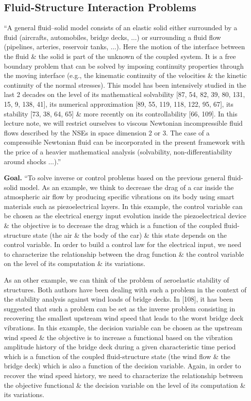\documentclass[oneside]{book}
\numberwithin{equation}{section}
\begin{document}
\subsection{Fluid-Structure Interaction Problems}
``A general fluid--solid model consists of an elastic solid either surrounded by a fluid (aircrafts, automobiles, bridge decks, $\ldots$) or surrounding a fluid flow (pipelines, arteries, reservoir tanks, $\ldots$). Here the motion of the interface between the fluid \& the solid is part of the unknown of the coupled system. It is a free boundary problem that can be solved by imposing continuity properties through the moving interface (e.g., the kinematic continuity of the velocities \& the kinetic continuity of the normal stresses). This model has been intensively studied in the last 2 decades on the level of its mathematical solvability [87, 54, 82, 39, 80, 131, 15, 9, 138, 41], its numerical approximation [89, 55, 119, 118, 122, 95, 67], its stability [73, 38, 64, 65] \& more recently on its controllability [66, 109]. In this lecture note, we will restrict ourselves to viscous Newtonian incompressible fluid flows described by the NSEs in space dimension 2 or 3. The case of a compressible Newtonian fluid can be incorporated in the present framework with the price of a heavier mathematical analysis (solvability, non-differentiability around shocks $\ldots$).''

\textbf{Goal.} ``To solve inverse or control problems based on the previous general fluid-solid model. As an example, we think to decrease the drag of a car inside the atmospheric air flow by producing specific vibrations on its body using smart materials such as piezoelectrical layers. In this example, the control variable can be chosen as the electrical energy input evolution inside the piezoelectrical device \& the objective is to decrease the drag which is a function of the coupled fluid-structure state (the air \& the body of the car) \& this state depends on the control variable. In order to build a control law for the electrical input, we need to characterize the relationship between the drag function \& the control variable on the level of its computation \& its variations.

As an other example, we can think of the problem of aeroelastic stability of structures. Both authors have been dealing with such a problem in the context of the stability analysis against wind loads of bridge decks. In [108], it has been suggested that such a problem can be set as the inverse problem consisting in recovering the smallest upstream wind speed that leads to the worst bridge deck vibrations. In this example, the decision variable can be chosen as the upstream wind speed \& the objective is to increase a functional based on the vibration amplitude history of the bridge deck during a given characteristic time period which is a function of the coupled fluid-structure state (the wind flow \& the bridge deck) which is also a function of the decision variable. Again, in order to recover the wind speed history, we need to characterize the relationship between the objective functional \& the decision variable on the level of its computation \& its variations.
\end{document}
